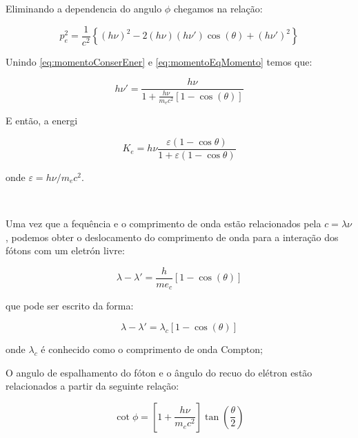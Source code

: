 \documentclass[11pt,a4paper]{article}
\begin{document}
            \noindent Eliminando a dependencia do angulo $\phi$ chegamos na relação:

            \begin{equation}
                p_e^2 = \frac{1}{c^2} \left\{ (h\nu)^2 - 2 (h\nu)(h\nu')\cos(\theta)+  (h\nu')^2\right\}
                \label{eq:momentoEqMomento}
            \end{equation}

            \noindent Unindo \ref{eq:momentoConserEner} e \ref{eq:momentoEqMomento} temos que:

                \begin{equation}
                    h\nu' = \frac{h\nu}{1 + \frac{h\nu}{m_ec^2}[1 - \cos(\theta)]}
                \end{equation}

            \noindent E então, a energi
            
                \begin{equation}
                    K_e = h\nu \frac{\varepsilon (1 - \cos \theta)}{1 + \varepsilon (1 - \cos \theta)}
                \end{equation}

            \noindent onde $\varepsilon = h\nu/m_e c^2$.

            \

            \noindent Uma vez que a fequência e o comprimento de onda estão relacionados pela  $c = \lambda \nu$, podemos obter o deslocamento do comprimento de onda para a interação dos fótons com um eletrón livre:

                \begin{equation}
                    \lambda - \lambda' = \frac{h}{me_c}[1 - \cos(\theta)]
                \end{equation}

            \noindent que pode ser escrito da forma:

                \begin{equation}
                    \lambda - \lambda' = \lambda_c[1 - \cos(\theta)]
                \end{equation}

            \noindent onde $\lambda_c$ é conhecido como o comprimento de onda Compton;


            \noindent O angulo de espalhamento do fóton e o ângulo do recuo do elétron estão relacionados a partir da seguinte relação:

                \begin{equation}
                    \cot \phi = \left[1 + \frac{h\nu}{m_ec^2} \right]\tan \left(\frac{\theta}{2}\right)
                \end{equation}
\end{document}

